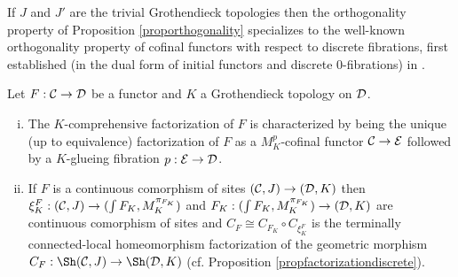 \documentclass[a4paper,12pt]{article}
\begin{document}
\begin{remark}
	If $J$ and $J'$ are the trivial Grothendieck topologies then the orthogonality property of Proposition \ref{proporthogonality} specializes to the well-known orthogonality property of cofinal functors with respect to discrete fibrations, first established (in the dual form of initial functors and discrete $0$-fibrations) in \cite{RossWalters}.
\end{remark} 
\begin{proposition}
Let	$F:{\cal C}\to {\cal D}$ be a functor and $K$ a Grothendieck topology  on $\cal D$. 
	\begin{enumerate}[(i)]
		\item The $K$-comprehensive factorization of $F$ is characterized by being the unique (up to equivalence) factorization of $F$ as a  $M^{p}_{K}$-cofinal functor ${\cal C}\to {\cal E}$ followed by a $K$-glueing fibration $p:{\cal E}\to {\cal D}$.
		
		\item If $F$ is a continuous comorphism of sites $({\cal C}, J)\to ({\cal D}, K)$ then $\xi^{F}_{K}:({\cal C}, J)\to ({\int F_{K}}, M^{\pi_{F_{K}}}_{K})$ and $F_{K}:({\int F_{K}}, M^{\pi_{F_{K}}}_{K}) \to ({\cal D}, K)$ are continuous comorphism of sites and $C_{F}\cong C_{F_{K}}\circ C_{\xi^{F}_{K}}$ is the terminally connected-local homeomorphism factorization of the geometric morphism $C_{F}:\Sh({\cal C}, J)\to \Sh({\cal D}, K)$ (cf. Proposition \ref{propfactorizationdiscrete}). 
	\end{enumerate}
\end{proposition} 
\end{document}

